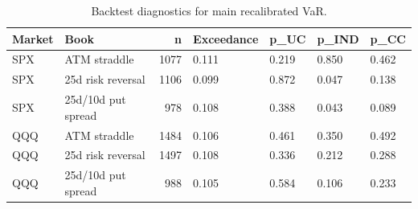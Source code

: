 \begin{table}
\caption{Backtest diagnostics for main recalibrated VaR.}
\label{tab:backtest_main_generated}
\begin{tabular}{llrllll}
\toprule
Market & Book & n & Exceedance & p\_UC & p\_IND & p\_CC \\
\midrule
SPX & ATM straddle & 1077 & 0.111 & 0.219 & 0.850 & 0.462 \\
SPX & 25d risk reversal & 1106 & 0.099 & 0.872 & 0.047 & 0.138 \\
SPX & 25d/10d put spread & 978 & 0.108 & 0.388 & 0.043 & 0.089 \\
QQQ & ATM straddle & 1484 & 0.106 & 0.461 & 0.350 & 0.492 \\
QQQ & 25d risk reversal & 1497 & 0.108 & 0.336 & 0.212 & 0.288 \\
QQQ & 25d/10d put spread & 988 & 0.105 & 0.584 & 0.106 & 0.233 \\
\bottomrule
\end{tabular}
\end{table}
